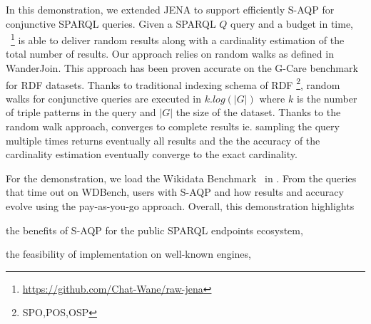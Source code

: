 In this demonstration, we extended JENA to support efficiently S-AQP
for conjunctive SPARQL queries.  Given a SPARQL $Q$ query and a budget
in time, \NAME~\footnote{\url{https://github.com/Chat-Wane/raw-jena}}
is able to deliver random results along with a cardinality estimation
of the total number of results. Our approach relies on random walks as
defined in WanderJoin\cite{li2016wanderjoin}. This approach has been
proven accurate on the G-Care
benchmark\cite{DBLP:conf/sigmod/ParkKBKHH20} for RDF datasets. Thanks
to traditional indexing schema of RDF \footnote{SPO,POS,OSP}, random
walks for conjunctive queries are executed in $k.log(|G|)$ where $k$
is the number of triple patterns in the query and $|G|$ the size of
the dataset. Thanks to the random walk approach, \NAME converges to
complete results ie. sampling the query multiple times returns
eventually all results and the the accuracy of the cardinality
estimation eventually converge to the exact cardinality.

\noindent For the demonstration, we load the Wikidata
Benchmark~\cite{angles2022wdbench} in \NAME. From the queries that
time out on WDBench, users  with S-AQP
and how results and accuracy evolve using the pay-as-you-go approach.
Overall, this demonstration highlights
\begin{inparaenum}[(i)]
\item the benefits of S-AQP for the public SPARQL endpoints ecosystem,
\item the feasibility of implementation on well-known engines,
\end{inparaenum}



